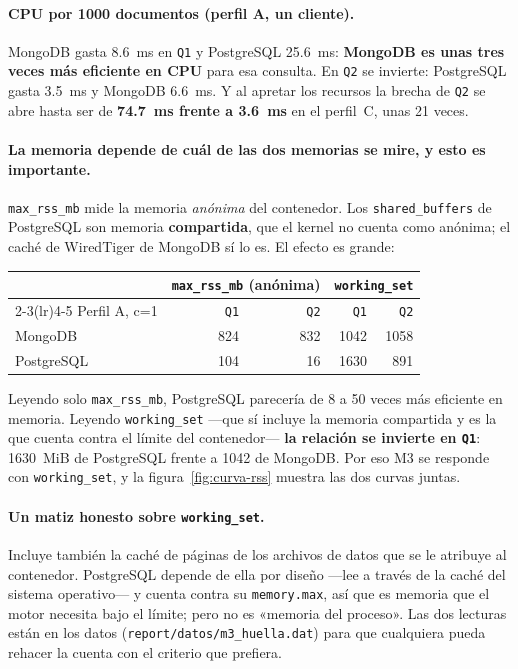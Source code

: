 \paragraph{CPU por 1000 documentos (perfil A, un cliente).}
MongoDB gasta 8.6~ms en \texttt{Q1} y PostgreSQL 25.6~ms: \textbf{MongoDB es unas
tres veces más eficiente en CPU} para esa consulta. En \texttt{Q2} se invierte:
PostgreSQL gasta 3.5~ms y MongoDB 6.6~ms. Y al apretar los recursos la brecha de
\texttt{Q2} se abre hasta ser de \textbf{74.7~ms frente a 3.6~ms} en el perfil~C,
unas 21 veces.

\paragraph{La memoria depende de cuál de las dos memorias se mire, y esto es importante.}
\texttt{max\_rss\_mb} mide la memoria \emph{anónima} del contenedor. Los
\texttt{shared\_buffers} de PostgreSQL son memoria \textbf{compartida}, que el
kernel no cuenta como anónima; el caché de WiredTiger de MongoDB sí lo es. El
efecto es grande:

\begin{center}
  \small
  \begin{tabular}{lrrrr}
    \toprule
    & \multicolumn{2}{c}{\texttt{max\_rss\_mb} (anónima)} & \multicolumn{2}{c}{\texttt{working\_set}} \\
    \cmidrule(lr){2-3}\cmidrule(lr){4-5}
    Perfil A, c=1 & \texttt{Q1} & \texttt{Q2} & \texttt{Q1} & \texttt{Q2} \\
    \midrule
    MongoDB    & 824 & 832 & 1042 & 1058 \\
    PostgreSQL & 104 & 16  & 1630 & 891 \\
    \bottomrule
  \end{tabular}
\end{center}

Leyendo solo \texttt{max\_rss\_mb}, PostgreSQL parecería de 8 a 50 veces más
eficiente en memoria. Leyendo \texttt{working\_set} —que sí incluye la memoria
compartida y es la que cuenta contra el límite del contenedor— \textbf{la relación
se invierte en \texttt{Q1}}: 1630~MiB de PostgreSQL frente a 1042 de MongoDB. Por
eso M3 se responde con \texttt{working\_set}, y la figura~\ref{fig:curva-rss}
muestra las dos curvas juntas.

\paragraph{Un matiz honesto sobre \texttt{working\_set}.}
Incluye también la caché de páginas de los archivos de datos que se le atribuye al
contenedor. PostgreSQL depende de ella por diseño —lee a través de la caché del
sistema operativo— y cuenta contra su \texttt{memory.max}, así que es memoria que
el motor necesita bajo el límite; pero no es «memoria del proceso». Las dos
lecturas están en los datos (\texttt{report/datos/m3\_huella.dat}) para que
cualquiera pueda rehacer la cuenta con el criterio que prefiera.

